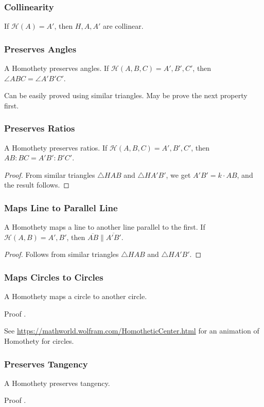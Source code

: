 \documentclass[11pt,twoside]{scrartcl}
\begin{document}
\subsubsection{Collinearity}
If $\mathcal{H}(A) = A'$, then $H, A, A'$ are collinear.
\subsubsection{Preserves Angles}
A Homothety preserves angles. If $\mathcal{H}(A, B, C) = A', B', C'$, then $ \angle ABC = \angle A'B'C'$.
\begin{note}
    Can be easily proved using similar triangles. May be prove the next property first.
\end{note}

\subsubsection{Preserves Ratios}
A Homothety preserves ratios. If $\mathcal{H}(A, B, C) = A', B', C'$, then $AB:BC = A'B':B'C'$.
\begin{proof}
    From similar triangles $\triangle HAB$ and $\triangle HA'B'$, we get $A'B' = k \cdot AB$, and the result follows.
\end{proof}

\subsubsection{Maps Line to Parallel Line}
A Homothety maps a line to another line parallel to the first. If $\mathcal{H}(A, B) = A', B'$, then $\overline{AB} \parallel \overline{A'B'}$.
\begin{proof}
    Follows from similar triangles $\triangle HAB$ and $\triangle HA'B'$.
\end{proof}

\subsubsection{Maps Circles to Circles}
A Homothety maps a circle to another circle.
\begin{remark}
    Proof \TBD.
\end{remark}
\begin{remark}
    See \url{https://mathworld.wolfram.com/HomotheticCenter.html} for an animation of Homothety for circles.
\end{remark}

\subsubsection{Preserves Tangency}
A Homothety preserves tangency.
\begin{remark}
    Proof \TBD.
\end{remark}
\end{document}

